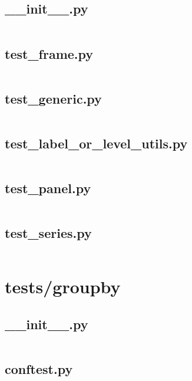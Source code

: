 \documentclass{article}
\begin{document}
\subsection{\_\_init\_\_.py}
\inputminted{python}{/home/dufferzafar/dev/@clones/pandas/pandas/tests/generic/__init__.py}
\newpage

\subsection{test\_frame.py}
\inputminted{python}{/home/dufferzafar/dev/@clones/pandas/pandas/tests/generic/test_frame.py}
\newpage

\subsection{test\_generic.py}
\inputminted{python}{/home/dufferzafar/dev/@clones/pandas/pandas/tests/generic/test_generic.py}
\newpage

\subsection{test\_label\_or\_level\_utils.py}
\inputminted{python}{/home/dufferzafar/dev/@clones/pandas/pandas/tests/generic/test_label_or_level_utils.py}
\newpage

\subsection{test\_panel.py}
\inputminted{python}{/home/dufferzafar/dev/@clones/pandas/pandas/tests/generic/test_panel.py}
\newpage

\subsection{test\_series.py}
\inputminted{python}{/home/dufferzafar/dev/@clones/pandas/pandas/tests/generic/test_series.py}
\newpage

\section{tests/groupby}

\subsection{\_\_init\_\_.py}
\inputminted{python}{/home/dufferzafar/dev/@clones/pandas/pandas/tests/groupby/__init__.py}
\newpage

\subsection{conftest.py}
\inputminted{python}{/home/dufferzafar/dev/@clones/pandas/pandas/tests/groupby/conftest.py}
\newpage
\end{document}
